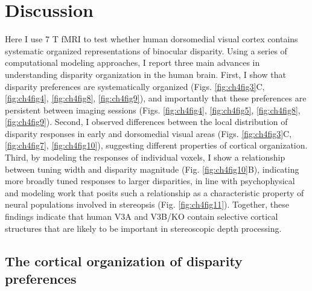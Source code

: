 \section{Discussion}
Here I use 7 T fMRI to test whether human dorsomedial visual cortex contains systematic organized representations of binocular disparity. Using a series of computational modeling approaches, I report three main advances in understanding disparity organization in the human brain. First, I show that disparity preferences are systematically organized (Figs. \ref{fig:ch4fig3}C, \ref{fig:ch4fig4}, \ref{fig:ch4fig8}, \ref{fig:ch4fig9}), and importantly that these preferences are persistent between imaging sessions (Figs. \ref{fig:ch4fig4}, \ref{fig:ch4fig5}, \ref{fig:ch4fig8}, \ref{fig:ch4fig9}). Second, I observed differences between the local distribution of disparity responses in early and dorsomedial visual areas (Figs. \ref{fig:ch4fig3}C, \ref{fig:ch4fig7}, \ref{fig:ch4fig10}), suggesting different properties of cortical organization. Third, by modeling the responses of individual voxels, I show a relationship between tuning width and disparity magnitude (Fig. \ref{fig:ch4fig10}B), indicating more broadly tuned responses to larger disparities, in line with psychophysical and modeling work that posits such a relationship as a characteristic property of neural populations involved in stereopsis (Fig. \ref{fig:ch4fig11}). Together, these findings indicate that human V3A and V3B/KO contain selective cortical structures that are likely to be important in stereoscopic depth processing.

\subsection{The cortical organization of disparity preferences}


